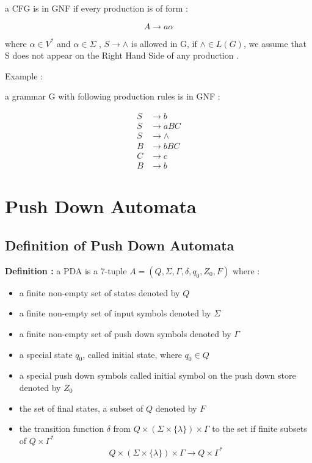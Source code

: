 \documentclass[12pt]{book}
\begin{document}
a CFG is in GNF if every production is of form :

$$
A \to a\alpha
$$

where $\alpha \in V^{*}$ and $\alpha \in \Sigma$ , $S \to \wedge$ is allowed in G, if $\wedge \in L(G)$, we assume that S does not appear on the Right Hand Side of any production .

Example : 

a grammar G with following production rules is in GNF :

\begin{align*}
S &\to b \\
S &\to aBC \\
S &\to \wedge \\
B &\to bBC \\
C &\to c \\
B &\to b 
\end{align*}



\chapter{Push Down Automata}

\section{Definition of Push Down Automata}

\textbf{Definition :} a PDA is a 7-tuple $A = (Q,\Sigma,\Gamma,\delta,q_{0},Z_{0},F)$ where :

\begin{itemize}
	\item a finite non-empty set of states denoted by $Q$
	\item a finite non-empty set of input symbols denoted by $\Sigma$
	\item a finite non-empty set of push down symbols denoted by $\Gamma$
	\item a special state $q_{0}$, called initial state, where $q_{0} \in Q$
	\item a special push down symbols called initial symbol on the push down store denoted by $Z_{0}$
	\item the set of final states, a subset of $Q$ denoted by $F$
	\item the transition function $\delta$ from $Q \times (\Sigma \times \{\lambda\}) \times \Gamma$ to the set if finite subsets of $Q \times \Gamma^{*}$
	$$
	Q \times (\Sigma \times \{\lambda\}) \times \Gamma \to Q \times \Gamma^{*}
	$$
\end{itemize}
\end{document}
